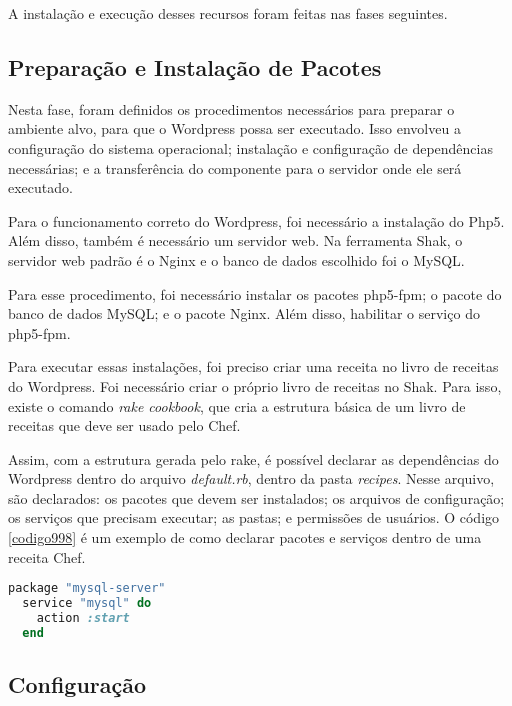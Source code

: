 A instalação e execução desses recursos foram feitas nas fases seguintes.

\subsection{Preparação e Instalação de Pacotes}
\label{wordpress:preparacao}

Nesta fase, foram definidos os procedimentos necessários para 
preparar o ambiente alvo, para que o Wordpress
possa ser executado. Isso envolveu a configuração do sistema operacional; instalação
e configuração de dependências necessárias; e a transferência do componente
para o servidor onde ele será executado.

Para o funcionamento correto do Wordpress, foi necessário a instalação do Php5. Além
disso, também é necessário um servidor web. Na ferramenta Shak, o servidor
web padrão é o Nginx e o banco de dados escolhido foi o MySQL.

Para esse procedimento, foi necessário instalar os pacotes php5-fpm; o pacote
do banco de dados MySQL; e o pacote Nginx. Além disso, habilitar o serviço do
php5-fpm.
 
Para executar essas instalações, foi preciso criar uma receita no livro de receitas
do Wordpress. Foi necessário criar o próprio livro de receitas no Shak.
Para isso, existe o comando \textit{rake cookbook}, que cria a estrutura básica
de um livro de receitas que deve ser usado pelo Chef.

Assim, com a estrutura gerada pelo rake, é possível declarar as dependências do Wordpress
dentro do arquivo \textit{default.rb}, dentro da pasta \textit{recipes}. Nesse 
arquivo, são declarados: os pacotes que devem ser instalados; os arquivos de configuração;
os serviços que precisam executar; as pastas; e permissões de usuários. O código \ref{codigo998}
é um exemplo de como declarar pacotes e serviços dentro de uma receita Chef.

\begin{lstlisting}[language=Ruby,label=dice_index,caption={Exemplo de criação de serviço do mysql com o chef}, label=codigo998]
  package "mysql-server"
  service "mysql" do
    action :start
  end
\end{lstlisting}

\subsection{Configuração}
\label{wordpress:preparacao}

